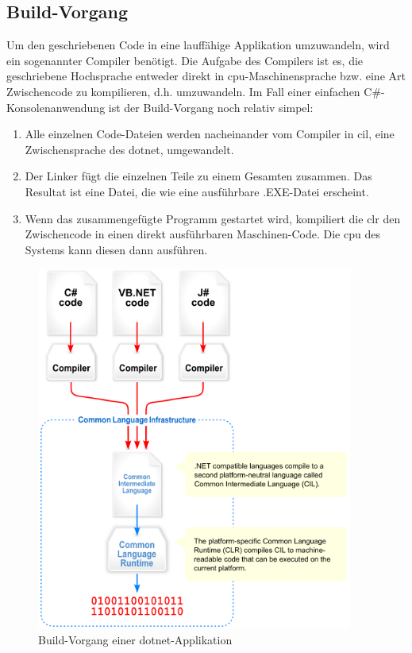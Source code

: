 \subsection{Build-Vorgang}
Um den geschriebenen Code in eine lauffähige Applikation umzuwandeln, wird ein sogenannter Compiler benötigt.
Die Aufgabe des Compilers ist es, die geschriebene Hochsprache entweder direkt in \ac{cpu}-Maschinensprache bzw. eine Art Zwischencode zu kompilieren, d.h. umzuwandeln. Im Fall einer einfachen C\#-Konsolenanwendung ist der Build-Vorgang noch relativ simpel:
\begin{enumerate}
    \item Alle einzelnen Code-Dateien werden nacheinander vom Compiler in \ac{cil}, eine Zwischensprache des \ac{dotnet}, umgewandelt.
    \item Der Linker fügt die einzelnen Teile zu einem Gesamten zusammen.
    Das Resultat ist eine Datei, die wie eine ausführbare .EXE-Datei erscheint.
    \item Wenn das zusammengefügte Programm gestartet wird, kompiliert die \ac{clr} den Zwischencode in einen direkt ausführbaren Maschinen-Code.
    Die \ac{cpu} des Systems kann diesen dann ausführen.
\end{enumerate}
\begin{figure}[H]
    \centering\includegraphics[height=12cm]{images/auswahl_rahmenwerk/dotnet-compilation.png}
    \caption{Build-Vorgang einer \ac{dotnet}-Applikation \cite{wiki-cli}}
\end{figure}

